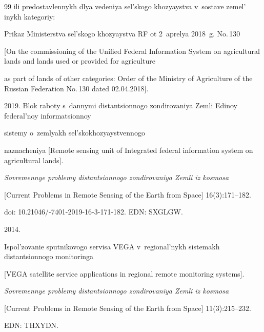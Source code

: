 {{\begin{thebibliography}{99}
ili predostav\-len\-nykh dlya ve\-de\-niya sel's\-ko\-go kho\-zyayst\-va v~so\-sta\-ve ze\-mel' inykh ka\-te\-go\-riy: 

Prikaz Ministerstva sel's\-ko\-go kho\-zyayst\-va RF ot 2~aprelya 2018~g. No.\,130 

[On the commissioning of the Unified Federal Information System on agricultural lands and lands used or provided for agriculture

 as part of lands of other categories: Order of the Ministry of Agriculture of the Russian Federation No.\,130 dated 02.04.2018].



 2019. Blok raboty s~dannymi dis\-tan\-tsi\-on\-no\-go zon\-di\-ro\-va\-niya Zem\-li Edi\-noy federal'noy in\-for\-ma\-tsi\-on\-noy 

 sis\-te\-my o~zem\-lyakh sel's\-ko\-kho\-zyayst\-ven\-no\-go 

 naz\-na\-che\-niya [Remote sensing unit of Integrated federal information system on agricultural lands].

  \textit{So\-vre\-men\-nye prob\-le\-my dis\-tan\-tsi\-on\-no\-go zon\-di\-ro\-va\-niya Zem\-li iz kos\-mo\-sa} 

  [Current Problems in Remote Sensing of the Earth from Space] 16(3):171--182. 

  doi: 10.21046\!/-7401-2019-16-3-171-182. EDN: SXGLGW.


 2014. 

Ispol'\-zo\-va\-nie sput\-ni\-ko\-vo\-go ser\-vi\-sa VEGA v~re\-gio\-nal'\-nykh sis\-te\-makh dis\-tan\-tsi\-on\-no\-go mo\-ni\-to\-rin\-ga 

[VEGA satellite service applications in regional remote monitoring systems]. 

 \textit{So\-vre\-men\-nye prob\-le\-my dis\-tan\-tsi\-on\-no\-go zon\-di\-ro\-va\-niya Zem\-li iz kos\-mo\-sa} 

 [Current Problems in Remote Sensing of the Earth from Space] 11(3):215--232. 

 EDN: THXYDN.

 



\end{thebibliography}}}
